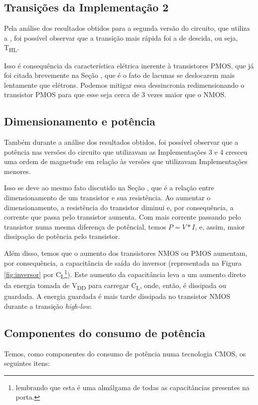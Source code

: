 \documentclass{iiufrgs}
\begin{document}
\subsection{Transições da Implementação 2}\label{timpl2}
Pela análise dos resultados obtidos para a segunda versão do circuito, que utiliza a , foi possível observar que a transição mais rápida foi a de descida, ou seja, T\textsubscript{HL}.

Isso é consequência da característica elétrica inerente à transistores PMOS, que já foi citada brevemente na Seção , que é o fato de lacunas se deslocarem mais lentamente que elétrons. Podemos mitigar essa dessincronia redimensionando o transistor PMOS para que esse seja cerca de 3 vezes maior que o NMOS.

\subsection{Dimensionamento e potência}\label{dimpot}
Também durante a análise dos resultados obtidos, foi possível observar que a potência nas versões do circuito que utilizavam as Implementações 3 e 4 cresceu uma ordem de magnetude em relação às versões que utilizavam Implementações menores.

Isso se deve ao mesmo fato discutido na Seção , que é a relação entre dimensionamento de um transistor e sua resistência. Ao aumentar o dimensionamento, a resistência do transistor diminui e, por consequência, a corrente que passa pelo transistor aumenta. Com mais corrente passando pelo transistor numa mesma diferença de potêncial, temos $P = V*I$, e, assim, maior dissipação de potência pelo transistor.

Além disso, temos que o aumento dos transistores NMOS ou PMOS aumentam, por consequência, a capacitância de saída do inversor (representada na Figura \ref{fig:inversor} por C\textsubscript{L}\footnote{lembrando que esta é uma almálgama de todas as capacitâncias presentes na porta.}). Este aumento da capacitância leva a um aumento direto da energia tomada de V\textsubscript{DD} para carregar C\textsubscript{L}, onde, então, é dissipada ou guardada. A energia guardada é mais tarde dissipada no transistor NMOS durante a transição \textit{high-low}.

\subsection{Componentes do consumo de potência}\label{comppot}
Temos, como componentes do consumo de potência numa tecnologia CMOS, os seguintes itens:
\end{document}
